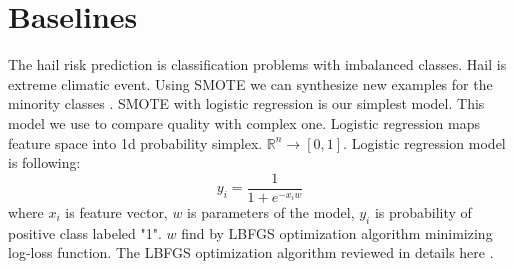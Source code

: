 \documentclass{article}
\begin{document}
\section{Baselines}
The hail risk prediction is classification problems with imbalanced classes. Hail is extreme climatic event. Using SMOTE we can synthesize new examples for the minority classes \cite{DBLP:journals/corr/abs-1106-1813}. SMOTE with logistic regression is our simplest model. This model we use to compare quality with complex one. Logistic regression maps feature space into 1d probability simplex. $\mathbb{R}^n \rightarrow [0,1]$. Logistic regression model is following:
\begin{equation}
    y_i = \frac{1}{1 + e^{-x_iw}}
\end{equation}
where $x_i$ is feature vector, $w$ is parameters of the model, $y_i$ is probability of positive class labeled "1". $w$ find by LBFGS optimization algorithm minimizing log-loss function. The LBFGS optimization algorithm reviewed in details here \cite{mokhtari2014global}.
    




\end{document}
